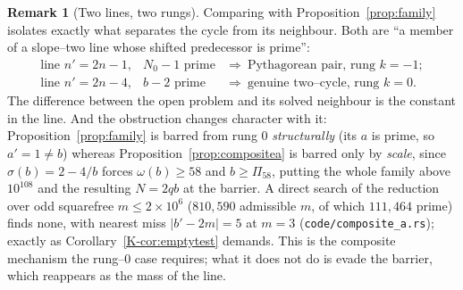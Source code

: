 \documentclass[11pt]{article}
\theoremstyle{definition}
\newtheorem{remark}[theorem]{Remark}
\begin{document}
\begin{remark}[Two lines, two rungs]\label{rem:twolines}
Comparing with Proposition~\ref{prop:family} isolates exactly what separates the cycle from its
neighbour. Both are ``a member of a slope--two line whose shifted predecessor is prime'':
\[
\begin{array}{lll}
\text{line } n'=2n-1, & N_0-1 \text{ prime} & \Longrightarrow\ \text{Pythagorean pair, rung } k=-1;\\
\text{line } n'=2n-4, & b-2 \text{ prime}   & \Longrightarrow\ \text{genuine two--cycle, rung } k=0.
\end{array}
\]
The difference between the open problem and its solved neighbour is the constant in the line. And the
obstruction changes character with it: Proposition~\ref{prop:family} is barred from rung $0$
\emph{structurally} (its $a$ is prime, so $a'=1\ne b$) whereas Proposition~\ref{prop:compositea}
is barred only by \emph{scale}, since $\sigma(b)=2-4/b$ forces $\omega(b)\ge58$ and $b\ge\Pi_{58}$,
putting the whole family above $10^{108}$ and the resulting $N=2qb$ at the barrier. A direct search of
the reduction over odd squarefree $m\le2\times10^6$ ($810{,}590$ admissible $m$, of which $111{,}464$
prime) finds none, with nearest miss $|b'-2m|=5$ at $m=3$ (\texttt{code/composite\_a.rs}); exactly
as Corollary~\ref{K-cor:emptytest} demands. This is the composite mechanism the rung--$0$ case requires;
what it does not do is evade the barrier, which reappears as the mass of the line.
\end{remark}
\end{document}
